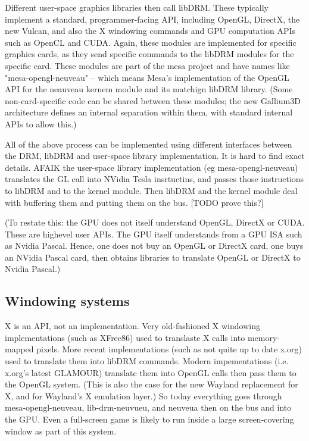 \documentclass[oneside,english]{scrbook}
\begin{document}
Different user-space graphics libraries then call libDRM.   These typically implement a standard, programmer-facing API, including OpenGL, DirectX, the new Vulcan, and also the X windowing commands and GPU computation APIs such as OpenCL and CUDA.  Again, these modules are implemented for specific graphics cards, as they send specific commands to the libDRM modules for the specific card.  These modules are part of the mesa project and have names like "mesa-opengl-neuveau" -- which means Mesa's implementation of the OpenGL API for the neauveau kernem module and its matchign libDRM library.   (Some non-card-specific code can be shared between these modules; the new Gallium3D architecture defines an internal separation within them, with standard internal APIs to allow this.)

All of the above process can be implemented using different interfaces between the DRM, libDRM and user-space library implementation.   It is hard to find exact details. AFAIK the user-space library implementation (eg mesa-opengl-neuveau) translates the GL call into NVidia Tesla insrtuctins, and passes those instructions to libDRM and to the kernel module. Then libDRM and the kernel module deal with buffering them and putting them on the bus. [TODO prove this?]

(To restate this: the GPU does not itself understand OpenGL, DirectX or CUDA.  These are highevel user APIs. The GPU itself understands from a GPU ISA such as Nvidia Pascal. Hence, one does not buy an OpenGL or DirectX card, one buys an NVidia Pascal card, then obtains libraries to translate OpenGL or DirectX to Nvidia Pascal.)

\subsection{Windowing systems}
X is an API, not an implementation.  Very old-fashioned X windowing implementations (such as XFree86) used to translaste X calls into memory-mapped pixels.  More recent implementations (such as not quite up to date x.org) used to translate them into libDRM commands.   Modern impementations (i.e. x.org's latest GLAMOUR) translate them into OpenGL calls then pass them to the OpenGL system. (This is also the case for the new Wayland replacement for X, and for Wayland's X emulation layer.)  So today everything goes through mesa-opengl-neuveau, lib-drm-neuvueu, and neuveua then on the bus and into the GPU.  Even a full-screen game is likely to run inside a large screen-covering window as part of this system.
\end{document}
